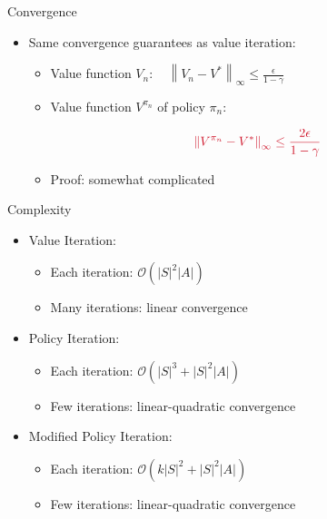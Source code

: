 \documentclass[11pt,table]{beamer}
\begin{document}
\begin{frame}{Convergence}

\begin{itemize}
    \item Same convergence guarantees as value iteration:

    \begin{itemize}
         
    
\item Value function \textcolor{red1}{$V_{n}: \quad\left\|V_{n}-V^{*}\right\|_{\infty} \leq \frac{\epsilon}{1-\gamma}$}
\item Value function $V^{\pi_{n}}$ of policy $\pi_{n}$:

$$
\textcolor{red1}{\left\|V^{\pi_{n}}-V^{*}\right\|_{\infty} \leq \frac{2 \epsilon}{1-\gamma}}
$$

\item Proof: somewhat complicated \citet[see][section 6.5]{puterman2014markov} 
\end{itemize}
   \end{itemize} 
\end{frame}

\begin{frame}{Complexity}

\begin{itemize}
    \item Value Iteration:

    \begin{itemize}
         
    
\item Each iteration: \textcolor{red1}{$\mathcal{O}\left(|S|^{2}|A|\right)$}
\item Many iterations: \textcolor{red1}{linear convergence}
\end{itemize}
\vspace{3mm} \pause
\item Policy Iteration:

\begin{itemize}
     

\item Each iteration: \textcolor{red1}{$\mathcal{O}\left(|S|^{3}+|S|^{2}|A|\right)$}
\item Few iterations: \textcolor{red1}{linear-quadratic convergence}
\end{itemize}
\vspace{3mm} \pause
\item Modified Policy Iteration:

\begin{itemize}
     

\item Each iteration: \textcolor{red1}{$\mathcal{O}\left(k|S|^{2}+|S|^{2}|A|\right)$}
\item Few iterations: \textcolor{red1}{linear-quadratic convergence}
\end{itemize}
    \end{itemize}
\end{frame}
\end{document}
